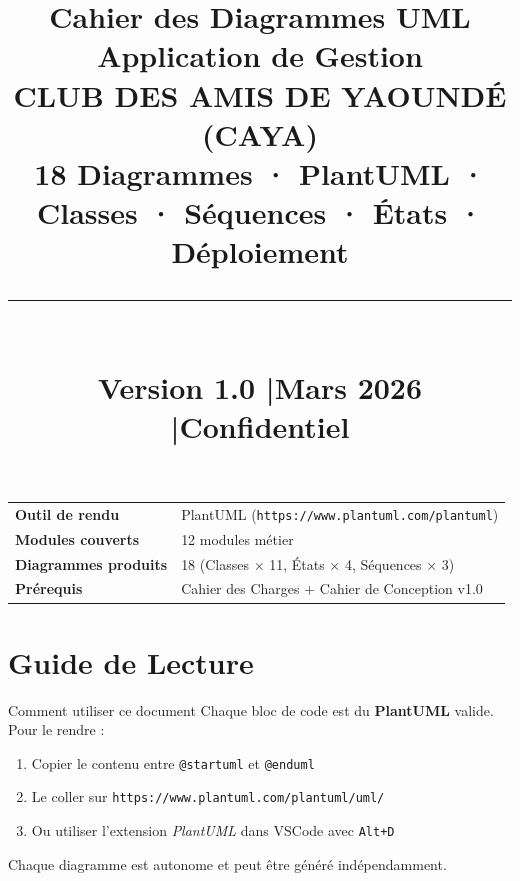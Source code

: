\documentclass[12pt, a4paper]{report}
\title{%
  \vspace{-1cm}
  {\Huge\bfseries\color{cayaBlue} Cahier des Diagrammes UML}\\[0.4cm]
  {\large\bfseries Application de Gestion\\[0.1cm]
  \textbf{\color{cayaGold}CLUB DES AMIS DE YAOUNDÉ (CAYA)}}\\[0.3cm]
  {\normalsize 18 Diagrammes · PlantUML · Classes · Séquences · États · Déploiement}\\[0.5cm]
  \rule{0.6\textwidth}{1pt}\\[0.4cm]
  {\small Version 1.0 \quad|\quad Mars 2026 \quad|\quad Confidentiel}
}
\author{}
\date{}
\begin{document}
\maketitle
\thispagestyle{empty}

\vfill
\begin{center}
\begin{tabular}{ll}
  \toprule
  \textbf{Outil de rendu} & PlantUML (\texttt{https://www.plantuml.com/plantuml}) \\
  \textbf{Modules couverts} & 12 modules métier \\
  \textbf{Diagrammes produits} & 18 (Classes × 11, États × 4, Séquences × 3) \\
  \textbf{Prérequis} & Cahier des Charges + Cahier de Conception v1.0 \\
  \bottomrule
\end{tabular}
\end{center}

\newpage
\tableofcontents
\newpage

\chapter*{Guide de Lecture}

\begin{noteBox}{Comment utiliser ce document}
Chaque bloc de code est du \textbf{PlantUML} valide. Pour le rendre :
\begin{enumerate}
  \item Copier le contenu entre \texttt{@startuml} et \texttt{@enduml}
  \item Le coller sur \texttt{https://www.plantuml.com/plantuml/uml/}
  \item Ou utiliser l'extension \textit{PlantUML} dans VSCode avec \texttt{Alt+D}
\end{enumerate}
Chaque diagramme est autonome et peut être généré indépendamment.
\end{noteBox}
\end{document}
